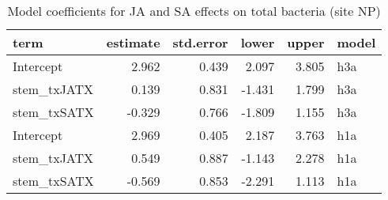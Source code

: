 \begin{table}

\caption{\label{tab:}Model coefficients for JA and SA effects on total bacteria (site NP)}
\centering
\begin{tabular}[t]{lrrrrl}
\toprule
term & estimate & std.error & lower & upper & model\\
\midrule
Intercept & 2.962 & 0.439 & 2.097 & 3.805 & h3a\\
stem_txJATX & 0.139 & 0.831 & -1.431 & 1.799 & h3a\\
stem_txSATX & -0.329 & 0.766 & -1.809 & 1.155 & h3a\\
Intercept & 2.969 & 0.405 & 2.187 & 3.763 & h1a\\
stem_txJATX & 0.549 & 0.887 & -1.143 & 2.278 & h1a\\
stem_txSATX & -0.569 & 0.853 & -2.291 & 1.113 & h1a\\
\bottomrule
\end{tabular}
\end{table}